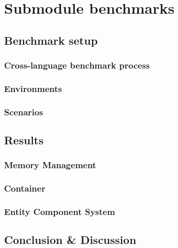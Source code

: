 \chapter{Submodule benchmarks}
\blindtext
\section{Benchmark setup}
\blindtext
\subsection{Cross-language benchmark process}
\blindtext
\subsection{Environments}
\blindtext
\subsection{Scenarios}
\blindtext
\section{Results}
\blindtext
\subsection{Memory Management}
\blindtext
\subsection{Container}
\blindtext
\subsection{Entity Component System}
\blindtext
\section{Conclusion \& Discussion}
\blindtext
